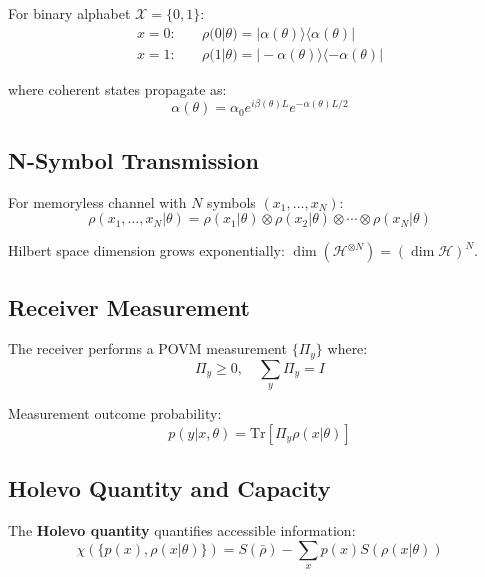 \documentclass[12pt,a4paper]{article}
\begin{document}
For binary alphabet $\mathcal{X} = \{0, 1\}$:
\begin{align}
x = 0: &\quad \rho(0|\theta) = |\alpha(\theta)\rangle\langle\alpha(\theta)| \\
x = 1: &\quad \rho(1|\theta) = |-\alpha(\theta)\rangle\langle-\alpha(\theta)|
\end{align}

where coherent states propagate as:
\begin{equation}
\alpha(\theta) = \alpha_0 e^{i\beta(\theta)L}e^{-\alpha(\theta)L/2}
\end{equation}

\subsection{N-Symbol Transmission}

For memoryless channel with $N$ symbols $(x_1, \ldots, x_N)$:
\begin{equation}
\rho(x_1, \ldots, x_N|\theta) = \rho(x_1|\theta) \otimes \rho(x_2|\theta) \otimes \cdots \otimes \rho(x_N|\theta)
\end{equation}

Hilbert space dimension grows exponentially: $\dim(\mathcal{H}^{\otimes N}) = (\dim \mathcal{H})^N$.

\subsection{Receiver Measurement}

The receiver performs a POVM measurement $\{\Pi_y\}$ where:
\begin{equation}
\Pi_y \geq 0, \quad \sum_y \Pi_y = I
\end{equation}

Measurement outcome probability:
\begin{equation}
p(y|x,\theta) = \text{Tr}[\Pi_y \rho(x|\theta)]
\end{equation}

\subsection{Holevo Quantity and Capacity}

The \textbf{Holevo quantity} quantifies accessible information:
\begin{equation}
\chi(\{p(x), \rho(x|\theta)\}) = S(\bar{\rho}) - \sum_x p(x)S(\rho(x|\theta))
\end{equation}
\end{document}
